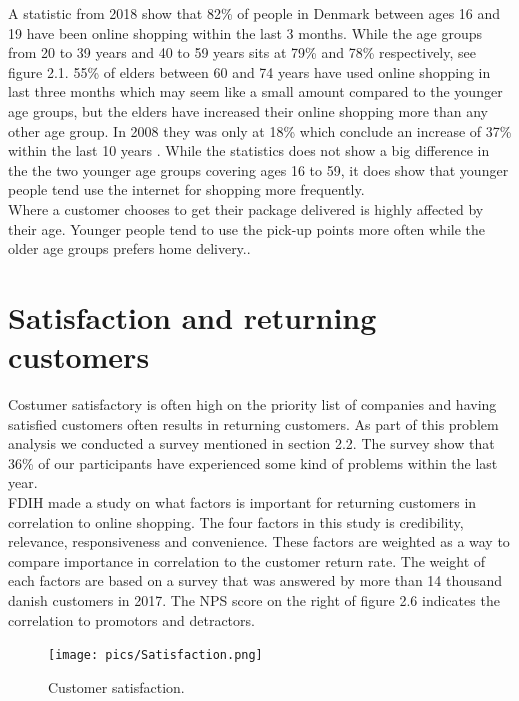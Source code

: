 \documentclass[12pt]{report}
\begin{document}
A statistic from 2018 show that 82\% of people in Denmark between ages 16 and 19 have been online shopping within the last 3 months. While the age groups from 20 to 39 years and 40 to 59 years sits at 79\% and 78\% respectively, see figure 2.1. 55\% of elders between 60 and 74 years have used online shopping in last three months which may seem like a small amount compared to the younger age groups, but the elders have increased their online shopping more than any other age group. In 2008 they was only at 18\% which conclude an increase of 37\% within the last 10 years \cite{danmarkstat1}.
While the statistics does not show a big difference in the the two younger age groups covering ages 16 to 59, it does show that younger people tend use the internet for shopping more frequently. \\
Where a customer chooses to get their package delivered is highly affected by their age. Younger people tend to use the pick-up points more often while the older age groups prefers home delivery.\cite{FDIHyearreport}. \\



\section{Satisfaction and returning customers}
Costumer satisfactory is often high on the priority list of companies and having satisfied customers often results in returning customers\cite{FDIHyearreport}. As part of this problem analysis we conducted a survey mentioned in section 2.2. The survey show that 36\% of our participants have experienced some kind of problems within the last year. \\\hspace*{5 mm}
FDIH made a study on what factors is important for returning customers in correlation to online shopping. The four factors in this study is credibility, relevance, responsiveness and convenience. These factors are weighted as a way to compare importance in correlation to the customer return rate. The weight of each factors are based on a survey that was answered by more than 14 thousand danish customers in 2017. The NPS score on the right of figure 2.6 indicates the correlation to promotors and detractors.

\begin{figure}[H]
  \centering
  \texttt{[image: pics/Satisfaction.png]}
  \caption{Customer satisfaction. \cite{FDIHyearreport}}
  \label{fig: Customer satisfaction}
\end{figure}
\end{document}

